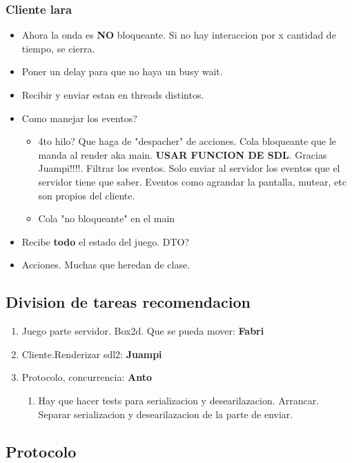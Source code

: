 \documentclass[11pt]{article}
\begin{document}
\subsubsection{Cliente lara}
\label{sec:org60a060f}
\begin{itemize}
\item Ahora la onda es \textbf{NO} bloqueante. Si no hay interaccion por x cantidad de tiempo, se cierra.
\item Poner un delay para que no haya un busy wait.
\item Recibir y enviar estan en threads distintos.
\item Como manejar los eventos?
\begin{itemize}
\item 4to hilo? Que haga de "despacher" de acciones. Cola bloqueante que le manda al render aka main. \textbf{\textbf{USAR FUNCION DE SDL}}. Gracias Juampi!!!!. Filtrar los eventos. Solo enviar al servidor los eventos que el servidor tiene que saber. Eventos como agrandar la pantalla, mutear, etc son propios del cliente.
\item Cola "no bloqueante" en el main
\end{itemize}
\item Recibe \textbf{todo} el estado del juego. DTO?
\item Acciones. Muchas que heredan de clase.
\end{itemize}

\subsection{Division de tareas recomendacion}
\label{sec:org91fd679}
\begin{enumerate}
\item Juego parte servidor. Box2d. Que se pueda mover: \textbf{Fabri}
\item Cliente.Renderizar sdl2: \textbf{Juampi}
\item Protocolo, concurrencia: \textbf{Anto}
\begin{enumerate}
\item Hay que hacer tests para serializacion y desearilazacion. Arrancar. Separar serializacion y desearilazacion de la parte de enviar.
\end{enumerate}
\end{enumerate}

\subsection{Protocolo}
\label{sec:org46b2963}
\end{document}
